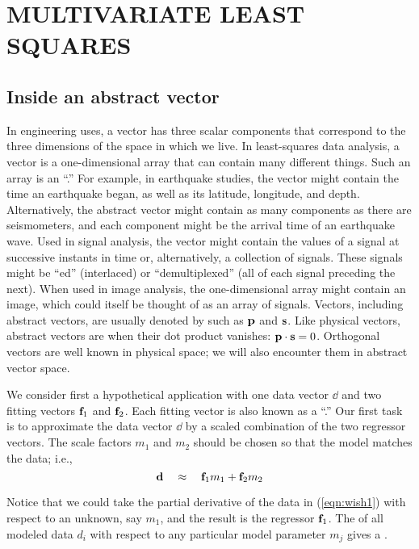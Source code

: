\section{MULTIVARIATE LEAST SQUARES}

\subsection{Inside an abstract vector}
In engineering uses,
a vector has three scalar components that
correspond to the three dimensions of the space in which we live.
In least-squares data analysis, a vector is a one-dimensional array
that can contain many different things.
Such an array is an ``.''
For example, in earthquake studies,
the vector might contain the time
an earthquake began, as well as its latitude, longitude, and depth.
Alternatively, the abstract vector
might contain as many components as there are seismometers,
and each component might be the arrival time of an earthquake wave.
Used in signal analysis,
the vector might contain the values of a signal
at successive instants in time or,
alternatively, a collection of signals.
These signals might be ``ed'' (interlaced)
or ``demultiplexed'' (all of each signal preceding the next).
When used in image analysis,
the one-dimensional array might contain an image,
which could itself be thought of as an array of signals.
Vectors, including abstract vectors,
are usually denoted by  such as $\bold p$ and $\bold s$.
Like physical vectors,
abstract vectors are 
when their dot product vanishes: $\bold p \cdot \bold s =0$.
Orthogonal vectors are well known in physical space;
we will also encounter them in abstract vector space.
\par
We consider first a hypothetical application
with one data vector $\dd$ and two
fitting vectors $\bold f_1$ and $\bold f_2$.
Each fitting vector is also known as a ``.''
Our first task is to approximate the data vector $\dd$
by a scaled combination of the two regressor vectors.
The scale factors $m_1$ and $m_2$
should be chosen so that the model matches the data; i.e.,
\begin{equation}
        {\bf d}  \quad \approx \quad \bold f_1 m_1 + \bold f_2 m_2
        \label{eqn:wish1}
\end{equation}
\par
Notice that we could take the partial derivative
of the data in (\ref{eqn:wish1}) with respect to an unknown,
say $m_1$,
and the result is the regressor $\bold f_1$.
The  of all modeled data $d_i$
with respect to any particular model parameter $m_j$
gives a .
\par
{}

